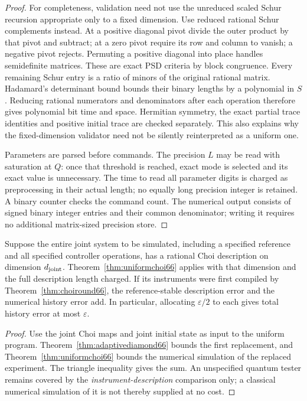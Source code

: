 \begin{proof}
For completeness, validation need not use the unreduced scaled Schur
recursion appropriate only to a fixed dimension. Use reduced rational
Schur complements instead. At a positive diagonal pivot divide the
outer product by that pivot and subtract; at a zero pivot require its
row and column to vanish; a negative pivot rejects. Permuting a positive
diagonal into place handles semidefinite matrices. These are exact PSD
criteria by block congruence. Every remaining Schur entry is a ratio
of minors of the original rational matrix. Hadamard's determinant bound
bounds their binary lengths by a polynomial in $S$. Reducing rational
numerators and denominators after each operation therefore gives
polynomial bit time and space. Hermitian symmetry, the exact partial
trace identities and positive initial trace are checked separately.
This also explains why the fixed-dimension validator need not be
silently reinterpreted as a uniform one.

Parameters are parsed before commands. The precision $L$ may be read
with saturation at $Q$: once that threshold is reached, exact mode is
selected and its exact value is unnecessary. The time to read all
parameter digits is charged as preprocessing in their actual length;
no equally long precision integer is retained. A binary counter checks
the command count. The numerical output consists of signed binary
integer entries and their common denominator; writing it requires no
additional matrix-sized precision store.
\end{proof}

\begin{corollary}\label{cor:jointsimulation66}
Suppose the entire joint system to be simulated, including a specified
reference and all specified controller operations, has a rational Choi
description on dimension $d_{\rm joint}$. Theorem~\ref{thm:uniformchoi66}
applies with that dimension and the full description length charged.
If its instruments were first compiled by
Theorem~\ref{thm:choiround66}, the reference-stable description error
and the numerical history error add. In particular, allocating
$\varepsilon/2$ to each gives total history error at most $\varepsilon$.
\end{corollary}
\begin{proof}
Use the joint Choi maps and joint initial state as input to the uniform
program. Theorem~\ref{thm:adaptivediamond66} bounds the first
replacement, and Theorem~\ref{thm:uniformchoi66} bounds the numerical
simulation of the replaced experiment. The triangle inequality gives
the sum. An unspecified quantum tester remains covered by the
\emph{instrument-description} comparison only; a classical numerical
simulation of it is not thereby supplied at no cost.
\end{proof}

